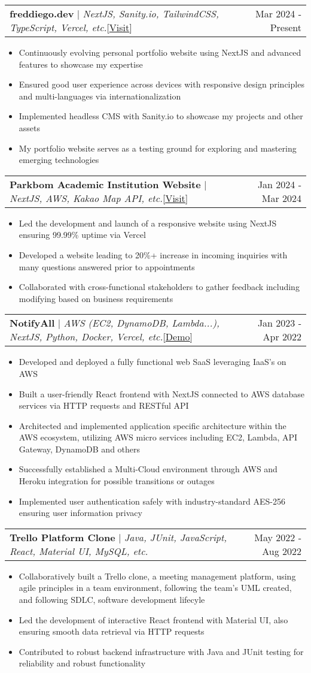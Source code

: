 \documentclass[letterpaper,11pt]{article}
\makeatletter
\newcommand{\resumeProjectHeading}[2]{
    \item
    \begin{tabular*}{0.97\textwidth}{l@{\extracolsep{\fill}}r}
      #1 & \small#2 \\
    \end{tabular*}\vspace{-5pt}
}
\newcommand{\resumeItem}[1] {\item\small {#1 \vspace{-4pt}}}
\newcommand{\resumeItemListStart}{\begin{itemize}\vspace{-2pt}}
\newcommand{\resumeItemListEnd}{\end{itemize}\vspace{-7pt}}
\makeatother
\begin{document}
      \resumeProjectHeading
          {\textbf{freddiego.dev} $|$ \emph{NextJS, Sanity.io, TailwindCSS, TypeScript, Vercel, etc.}{\small[\href{https://freddiego.dev}{\underline{Visit}}]}}{Mar 2024 - Present}
          \resumeItemListStart
            \resumeItem{Continuously evolving personal portfolio website using NextJS and advanced features to showcase my expertise}
            \resumeItem{Ensured good user experience across devices with responsive design principles and multi-languages via internationalization}
            \resumeItem{Implemented headless CMS with Sanity.io to showcase my projects and other assets}
            \resumeItem{My portfolio website serves as a testing ground for exploring and mastering emerging technologies}
          \resumeItemListEnd
      \resumeProjectHeading
          {\textbf{Parkbom Academic Institution Website} $|$ \emph{NextJS, AWS, Kakao Map API, etc.}{\small[\href{https://www.parkbomacademy.com}{\underline{Visit}}]}}{Jan 2024 - Mar 2024}
          \resumeItemListStart
            \resumeItem{Led the development and launch of a responsive website using NextJS ensuring 99.99\% uptime via Vercel}
            \resumeItem{Developed a website leading to 20\%+ increase in incoming inquiries with many questions answered prior to appointments}
            \resumeItem{Collaborated with cross-functional stakeholders to gather feedback including modifying based on business requirements}
          \resumeItemListEnd
      \resumeProjectHeading
          {\textbf{NotifyAll} $|$ \emph{AWS (EC2, DynamoDB, Lambda...), NextJS, Python, Docker, Vercel, etc.}{\small[\href{https://www.youtube.com/watch?v=HWyE7KBI-ww}{\underline{Demo}}]}}{Jan 2023 - Apr 2022}
          \resumeItemListStart
            \resumeItem{Developed and deployed a fully functional web SaaS leveraging IaaS’s on AWS}
            \resumeItem{Built a user-friendly React frontend with NextJS connected to AWS database services via HTTP requests and RESTful API}
            \resumeItem{Architected and implemented application specific architecture within the AWS ecosystem, utilizing AWS micro services including EC2, Lambda, API Gateway, DynamoDB and others}
            \resumeItem{Successfully established a Multi-Cloud environment through AWS and Heroku integration for possible transitions or outages}
            \resumeItem{Implemented user authentication safely with industry-standard AES-256 ensuring user information privacy}
          \resumeItemListEnd

      \resumeProjectHeading
          {\textbf{Trello Platform Clone } $|$ \emph{Java, JUnit, JavaScript, React, Material UI, MySQL, etc.}}{May 2022 - Aug 2022}
          \resumeItemListStart
            \resumeItem{Collaboratively built a Trello clone, a meeting management platform, using agile principles in a team environment, following the team’s UML created, and following SDLC, software development lifecyle}
            \resumeItem{Led the development of interactive React frontend with Material UI, also ensuring smooth data retrieval via HTTP requests}
            \resumeItem{Contributed to robust backend infrastructure with Java and JUnit testing for reliability and robust functionality}
          \resumeItemListEnd
\end{document}
